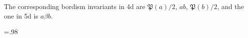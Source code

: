 \documentclass[12pt]{article}
\numberwithin{equation}{section}
\begin{document}
The corresponding bordism invariants in 4d are $\mathfrak{P}(a)/2$, $ab$, $\mathfrak{P}(b)/2$, 
and the one in 5d is $a\beta b$.




\def\arxivfont{\rm}


\baselineskip=.98\baselineskip
\let\originalthebibliography\thebibliography
\renewcommand\thebibliography[1]{
  \originalthebibliography{#1}
  \setlength{\itemsep}{0pt plus 0.3ex}
}


\end{document}
